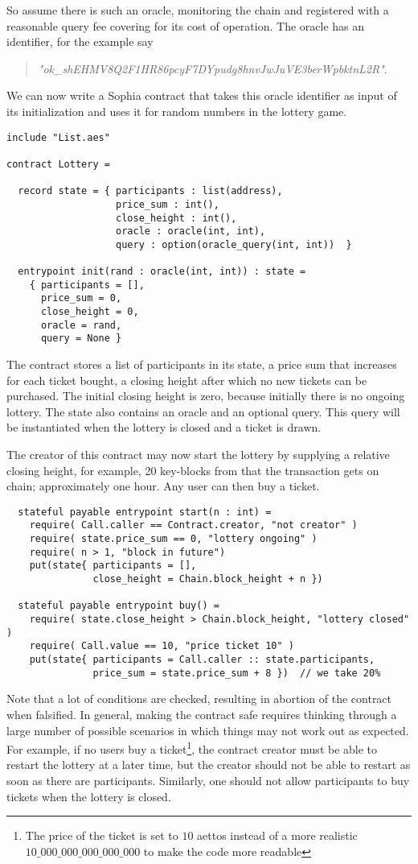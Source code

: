 So assume there is such an oracle, monitoring the chain and registered
with a reasonable query fee covering for its cost of operation. The
oracle has an identifier, for the example say
\begin{quote}
  \textit{"ok\_shEHMV8Q2F1HR86pcyF7DYpudg8hnvJwJuVE3berWpbktnL2R"}.
\end{quote}
We can now write a Sophia contract that takes this oracle identifier
as input of its initialization and uses it for random numbers in the
lottery game.

\begin{verbatim}
include "List.aes"

contract Lottery =

  record state = { participants : list(address),
                   price_sum : int(),
                   close_height : int(),
                   oracle : oracle(int, int),
                   query : option(oracle_query(int, int))  }

  entrypoint init(rand : oracle(int, int)) : state =
    { participants = [],
      price_sum = 0,
      close_height = 0,
      oracle = rand,
      query = None }
\end{verbatim}

The contract stores a list of participants in its state, a price sum
that increases for each ticket bought, a closing height after which no
new tickets can be purchased. The initial closing height is zero,
because initially there is no ongoing lottery. The state also contains
an oracle and an optional query. This query will be instantiated when
the lottery is closed and a ticket is drawn.

The creator of this contract may now start the lottery by supplying a relative closing height,
for example, 20 key-blocks from that the transaction gets on chain;
approximately one hour. Any user can then buy a ticket.
\begin{verbatim}
  stateful payable entrypoint start(n : int) =
    require( Call.caller == Contract.creator, "not creator" )
    require( state.price_sum == 0, "lottery ongoing" )
    require( n > 1, "block in future")
    put(state{ participants = [],
               close_height = Chain.block_height + n })

  stateful payable entrypoint buy() =
    require( state.close_height > Chain.block_height, "lottery closed" )
    require( Call.value == 10, "price ticket 10" )
    put(state{ participants = Call.caller :: state.participants,
               price_sum = state.price_sum + 8 })  // we take 20%
\end{verbatim}
Note that a lot of conditions are checked, resulting in abortion of
the contract when falsified. In general, making the contract safe
requires thinking through a large number of possible scenarios in
which things may not work out as expected.
For example, if no users buy a ticket\footnote{The price of the ticket
is set to $10$ aettos instead of a more realistic  $10\_000\_000\_000\_000\_000$ to
make the code more readable}, the contract creator must be
able to restart the lottery at a later time, but the creator should
not be able to restart as soon as there are participants. Similarly,
one should not allow participants to buy tickets when the lottery is
closed.

